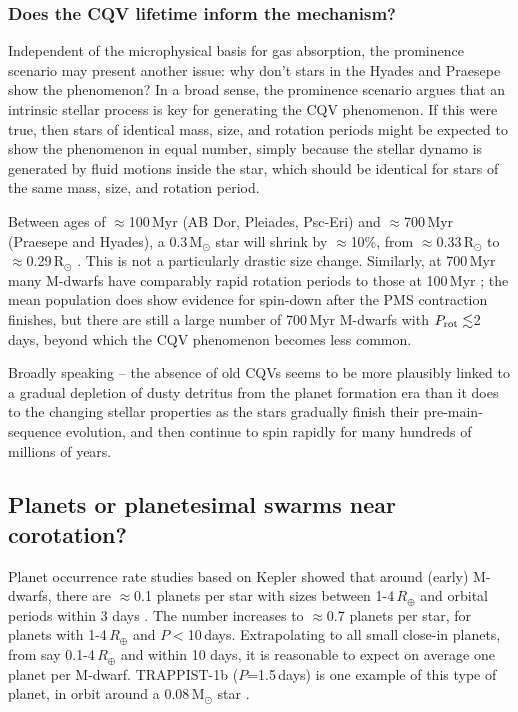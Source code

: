 \documentclass[11pt,twocolumn,tighten]{aastex63}
\begin{document}
\subsubsection{Does the CQV lifetime inform the mechanism?}
Independent of the microphysical basis for gas absorption, the
prominence scenario may present another issue: why don't stars in the
Hyades and Praesepe show the phenomenon?
In a broad sense, the prominence scenario argues that an intrinsic
stellar process is key for generating the CQV phenomenon.
If this were true, then stars of identical mass, size, and rotation
periods might be expected to show the phenomenon in equal number,
simply because the stellar dynamo is generated by fluid
motions inside the star, which should be identical for stars of the
same mass, size, and rotation period.

Between ages of $\approx$100\,Myr (AB Dor, Pleiades, Psc-Eri) and
$\approx$700\,Myr (Praesepe and Hyades), a 0.3\,M$_\odot$ star will
shrink by $\approx$10\%, from $\approx$0.33\,R$_\odot$ to 
$\approx$0.29\,R$_\odot$ \citep[e.g.][]{2014AJ....147...82C}.
This is not a particularly drastic size change.
Similarly, at 700\,Myr many M-dwarfs have comparably rapid rotation periods 
to those at 100\,Myr \citep[e.g. Figure~13 of][]{2022AJ....164...80R};
the mean population does show evidence for spin-down after the
PMS contraction finishes, but there are still a large number of 
700\,Myr M-dwarfs with $P_{\rm rot}\lesssim$2\,days, beyond
which the CQV phenomenon becomes less common.

Broadly speaking -- the absence of old CQVs seems to be
more plausibly linked to a gradual depletion of dusty detritus from the
planet formation era than it does to the changing stellar properties
as the stars gradually finish their pre-main-sequence evolution, and then
continue to spin rapidly for many hundreds of millions of years.


\subsection{Planets or planetesimal swarms near corotation?}

Planet occurrence rate studies based on Kepler showed that around
(early) M-dwarfs, there are $\approx$0.1 planets per star with sizes
between 1-4\,$R_\oplus$ and orbital periods within 3 days
\citep{2015ApJ...807...45D}.  The number increases to $\approx$0.7
planets per star, for planets with 1-4\,$R_\oplus$ and $P$$<$10\,days.
Extrapolating to all small close-in planets, from say
0.1-4\,$R_\oplus$ and within 10 days, it is reasonable to expect on
average one planet per M-dwarf.  TRAPPIST-1b ($P$=1.5\,days) is one
example of this type of planet, in orbit around a 0.08\,M$_\odot$ star  \citep{2017Natur.542..456G}.
\end{document}

